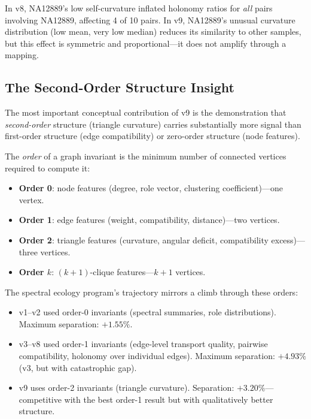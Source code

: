 \documentclass{../yalumba}
\begin{document}
In v8, NA12889's low self-curvature inflated holonomy ratios for \emph{all}
pairs involving NA12889, affecting 4 of 10 pairs.  In v9, NA12889's unusual
curvature distribution (low mean, very low median) reduces its similarity
to other samples, but this effect is symmetric and proportional---it does
not amplify through a mapping.

\subsection{The Second-Order Structure Insight}

The most important conceptual contribution of v9 is the demonstration that
\emph{second-order} structure (triangle curvature) carries substantially
more signal than first-order structure (edge compatibility) or zero-order
structure (node features).

\begin{definition}
The \emph{order} of a graph invariant is the minimum number of connected
vertices required to compute it:
\begin{itemize}
  \item \textbf{Order 0}: node features (degree, role vector, clustering
    coefficient)---one vertex.
  \item \textbf{Order 1}: edge features (weight, compatibility,
    distance)---two vertices.
  \item \textbf{Order 2}: triangle features (curvature, angular deficit,
    compatibility excess)---three vertices.
  \item \textbf{Order $k$}: $(k+1)$-clique features---$k+1$ vertices.
\end{itemize}
\end{definition}


The spectral ecology program's trajectory mirrors a climb through these
orders:

\begin{itemize}
  \item v1--v2 used order-0 invariants (spectral summaries, role
    distributions).  Maximum separation: $+1.55\%$.
  \item v3--v8 used order-1 invariants (edge-level transport quality,
    pairwise compatibility, holonomy over individual edges).  Maximum
    separation: $+4.93\%$ (v3, but with catastrophic gap).
  \item v9 uses order-2 invariants (triangle curvature).  Separation:
    $+3.20\%$---competitive with the best order-1 result but with
    qualitatively better structure.
\end{itemize}
\end{document}
